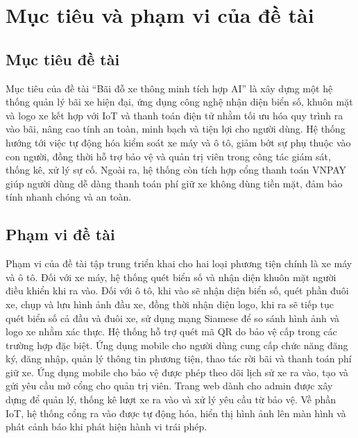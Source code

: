 \section{Mục tiêu và phạm vi của đề tài}

\subsection{Mục tiêu đề tài}

Mục tiêu của đề tài “Bãi đỗ xe thông minh tích hợp AI” là xây dựng một hệ thống quản lý bãi xe hiện đại, ứng dụng công nghệ nhận diện biển số, khuôn mặt và logo xe kết hợp với IoT và thanh toán điện tử nhằm tối ưu hóa quy trình ra vào bãi, nâng cao tính an toàn, minh bạch và tiện lợi cho người dùng. Hệ thống hướng tới việc tự động hóa kiểm soát xe máy và ô tô, giảm bớt sự phụ thuộc vào con người, đồng thời hỗ trợ bảo vệ và quản trị viên trong công tác giám sát, thống kê, xử lý sự cố. Ngoài ra, hệ thống còn tích hợp cổng thanh toán VNPAY giúp người dùng dễ dàng thanh toán phí giữ xe không dùng tiền mặt, đảm bảo tính nhanh chóng và an toàn.

\subsection{Phạm vi đề tài}

Phạm vi của đề tài tập trung triển khai cho hai loại phương tiện chính là xe máy và ô tô. Đối với xe máy, hệ thống quét biển số và nhận diện khuôn mặt người điều khiển khi ra vào. Đối với ô tô, khi vào sẽ nhận diện biển số, quét phần đuôi xe, chụp và lưu hình ảnh đầu xe, đồng thời nhận diện logo, khi ra sẽ tiếp tục quét biển số cả đầu và đuôi xe, sử dụng mạng Siamese để so sánh hình ảnh và logo xe nhằm xác thực. Hệ thống hỗ trợ quét mã QR do bảo vệ cấp trong các trường hợp đặc biệt. Ứng dụng mobile cho người dùng cung cấp chức năng đăng ký, đăng nhập, quản lý thông tin phương tiện, thao tác rời bãi và thanh toán phí giữ xe. Ứng dụng mobile cho bảo vệ được phép theo dõi lịch sử xe ra vào, tạo và gửi yêu cầu mở cổng cho quản trị viên. Trang web dành cho admin được xây dựng để quản lý, thống kê lượt xe ra vào và xử lý yêu cầu từ bảo vệ. Về phần IoT, hệ thống cổng ra vào được tự động hóa, hiển thị hình ảnh lên màn hình và phát cảnh báo khi phát hiện hành vi trái phép.